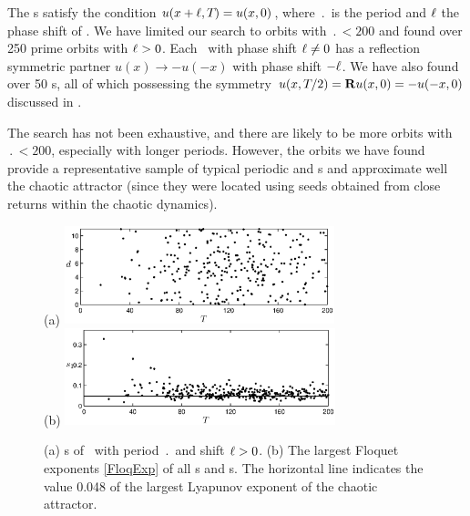 

The \rpo s satisfy the condition $u(x+\ell,{T_{}}) = u(x,0)$,
where $\period{}$ is the period and $\ell$ the phase shift of \rpo .
We have limited our search to orbits with $\period{} < 200$ and found
over 250 prime orbits with $\ell > 0$.  Each \rpo\ with phase shift
$\ell \neq 0$ has a reflection symmetric partner
$u(x) \to -u(-x)$ with phase shift $-\ell$.  We have also found over
50 \po s, all of which possessing the symmetry $u(x,{T_{}}/2) =
{\bf R} u(x,0) = -u(-x,0)$ discussed in .

The search has not been exhaustive, and there are likely to be more
orbits with $\period{} < 200$, especially with longer periods.
However, the orbits we have found provide a representative sample of
typical periodic and \rpo s and approximate well the chaotic
attractor (since they were located using seeds obtained from close
returns within the chaotic dynamics).

\begin{figure}[t]
\begin{center}
(a) \includegraphics[width=0.7\textwidth]{figs/ks22_rpos_Tdelta.eps}
\\
(b) \includegraphics[width=0.7\textwidth]{figs/ks22_rpos_lyap.eps}
\end{center}
\caption{
(a) \Rpo s of \KSe\ with period $\period{}$ and shift
$\ell > 0$.
(b) The largest Floquet exponents \ref{FloqExp} of all \po s
and \rpo s.  The horizontal
line indicates the value 0.048 of the largest Lyapunov exponent
of the chaotic attractor.
} \label{f:ks22rposT}
\end{figure}

